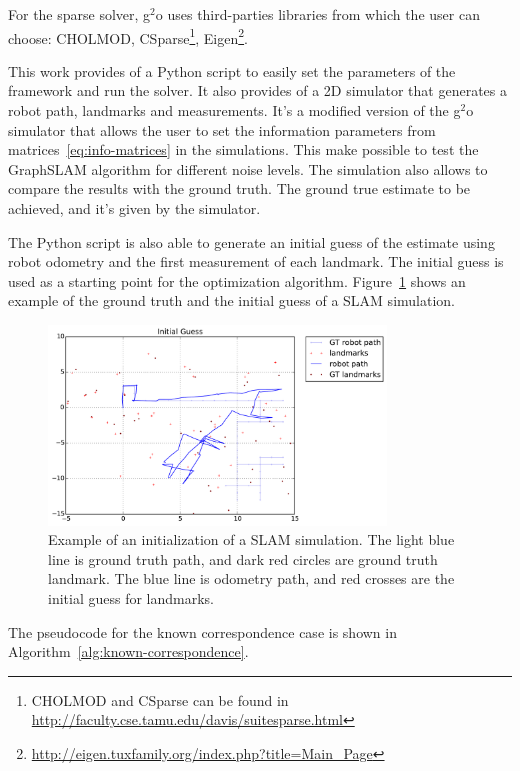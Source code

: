 For the sparse solver, g$^2$o uses third-parties libraries from which the user can choose: CHOLMOD, CSparse\footnote{CHOLMOD and CSparse can be found in \url{http://faculty.cse.tamu.edu/davis/suitesparse.html}}, Eigen\footnote{\url{http://eigen.tuxfamily.org/index.php?title=Main_Page}}. 

This work provides of a Python script to easily set the parameters of the framework and run the solver. It also provides of a 2D simulator that generates a robot path, landmarks and measurements. It's a modified version of the g$^2$o simulator that allows the user to set the information parameters from matrices~\eqref{eq:info-matrices} in the simulations. This make possible to test the GraphSLAM algorithm for different noise levels. The simulation also allows to compare the results with the ground truth. The ground true estimate to be achieved, and it's given by the simulator. 

The Python script is also able to generate an initial guess of the estimate using robot odometry and the first measurement of each landmark. The initial guess is used as a starting point for the optimization algorithm. Figure~\ref{fig:simulation} shows an example of the ground truth and the initial guess of a SLAM simulation.

\begin{figure}[htbp!]
    \centering
    \includegraphics[width=0.8\textwidth]{imagenes/guess_op_100_oa_100_lp_100_ds_100.pdf}
    \caption{Example of an initialization of a SLAM simulation. The light blue line is ground truth path, and dark red circles are ground truth landmark. The blue line is odometry path, and red crosses are the initial guess for landmarks.}
    \label{fig:simulation}
\end{figure}

The pseudocode for the known correspondence case is shown in Algorithm~\ref{alg:known-correspondence}.

